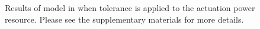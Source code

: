\documentclass[twocolumn,english]{IEEEconf}
\theoremstyle{plain}
\theoremstyle{definition}
\theoremstyle{definition}
\theoremstyle{plain}
\newcommand{\colR}{\color[rgb]{0.555789,0.000000,0.000000}}
\newcommand{\R}[1]{{\colR #1}}
\begin{document}
\begin{figure}[H]

\caption{Results of model in  when tolerance is applied
to the actuation \R{power} resource. Please see the supplementary
materials for more details.}
\end{figure}
\end{document}
